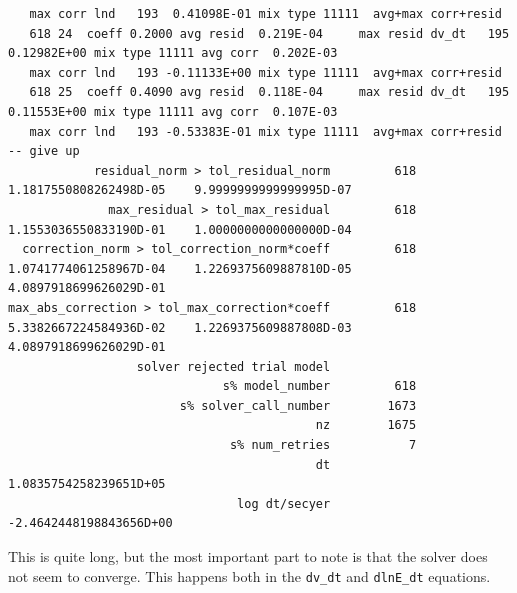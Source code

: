 \documentclass[a4paper,10pt]{article}
\begin{document}
\begin{verbatim}
   max corr lnd   193  0.41098E-01 mix type 11111  avg+max corr+resid
   618 24  coeff 0.2000 avg resid  0.219E-04     max resid dv_dt   195  0.12982E+00 mix type 11111 avg corr  0.202E-03
   max corr lnd   193 -0.11133E+00 mix type 11111  avg+max corr+resid
   618 25  coeff 0.4090 avg resid  0.118E-04     max resid dv_dt   195  0.11553E+00 mix type 11111 avg corr  0.107E-03
   max corr lnd   193 -0.53383E-01 mix type 11111  avg+max corr+resid -- give up
            residual_norm > tol_residual_norm         618    1.1817550808262498D-05    9.9999999999999995D-07
              max_residual > tol_max_residual         618    1.1553036550833190D-01    1.0000000000000000D-04
  correction_norm > tol_correction_norm*coeff         618    1.0741774061258967D-04    1.2269375609887810D-05    4.0897918699626029D-01
max_abs_correction > tol_max_correction*coeff         618    5.3382667224584936D-02    1.2269375609887808D-03    4.0897918699626029D-01
                  solver rejected trial model
                              s% model_number         618
                        s% solver_call_number        1673
                                           nz        1675
                               s% num_retries           7
                                           dt    1.0835754258239651D+05
                                log dt/secyer   -2.4642448198843656D+00
\end{verbatim}

This is quite long, but the most important part to note is that the solver does not seem to converge.
This happens both in the \lstinline[style=output, breaklines=true]|dv_dt| and \lstinline[style=output, breaklines=true]|dlnE_dt| equations.
\end{document}
